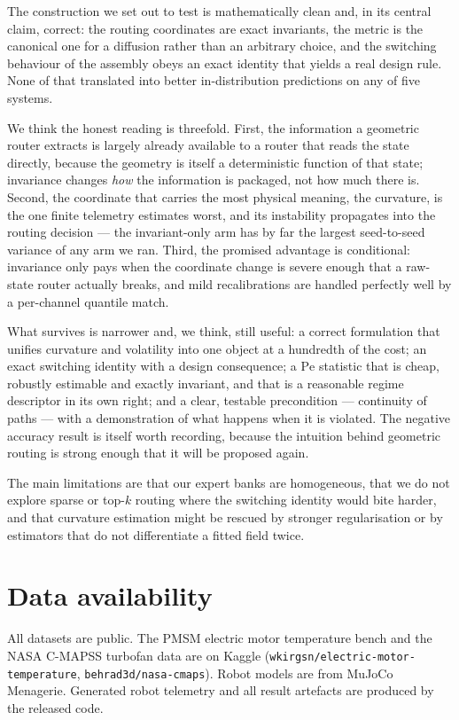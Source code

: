 \documentclass[11pt]{article}
\newcommand{\Pen}{\mathrm{Pe}}
\begin{document}
The construction we set out to test is mathematically clean and, in its central
claim, correct: the routing coordinates are exact invariants, the metric is the
canonical one for a diffusion rather than an arbitrary choice, and the
switching behaviour of the assembly obeys an exact identity that yields a real
design rule. None of that translated into better in-distribution predictions on
any of five systems.

We think the honest reading is threefold. First, the information a geometric
router extracts is largely already available to a router that reads the state
directly, because the geometry is itself a deterministic function of that
state; invariance changes \emph{how} the information is packaged, not how much
there is. Second, the coordinate that carries the most physical meaning, the
curvature, is the one finite telemetry estimates worst, and its instability
propagates into the routing decision --- the invariant-only arm has by far the
largest seed-to-seed variance of any arm we ran. Third, the promised advantage
is conditional: invariance only pays when the coordinate change is severe
enough that a raw-state router actually breaks, and mild recalibrations are
handled perfectly well by a per-channel quantile match.

What survives is narrower and, we think, still useful: a correct formulation
that unifies curvature and volatility into one object at a hundredth of the
cost; an exact switching identity with a design consequence; a $\Pen$ statistic
that is cheap, robustly estimable and exactly invariant, and that is a
reasonable regime descriptor in its own right; and a clear, testable
precondition --- continuity of paths --- with a demonstration of what happens
when it is violated. The negative accuracy result is itself worth recording,
because the intuition behind geometric routing is strong enough that it will be
proposed again.

The main limitations are that our expert banks are homogeneous, that we do not
explore sparse or top-$k$ routing where the switching identity would bite
harder, and that curvature estimation might be rescued by stronger
regularisation or by estimators that do not differentiate a fitted field twice.

\section*{Data availability}

All datasets are public. The PMSM electric motor temperature bench and the NASA
C-MAPSS turbofan data are on Kaggle
(\texttt{wkirgsn/electric-motor-temperature}, \texttt{behrad3d/nasa-cmaps}).
Robot models are from MuJoCo Menagerie. Generated robot telemetry and all
result artefacts are produced by the released code.
\end{document}
